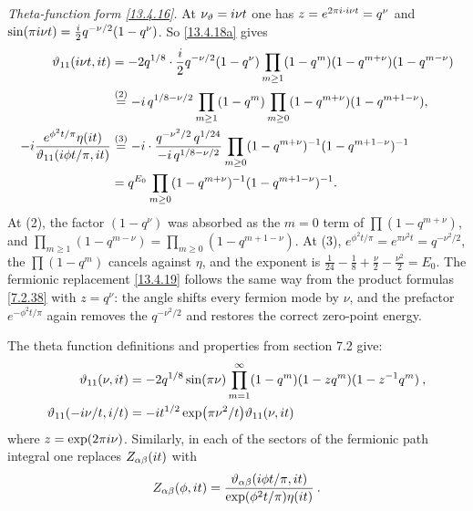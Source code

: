 \begin{tcolorbox}[breakable]
\begin{remark}
		\textit{Theta-function form \eqref{13.4.16}.} At $\nu_\vartheta=i\nu t$ one has $z=e^{2\pi i\cdot i\nu t}=q^{\nu}$ and $\sin(\pi i\nu t)=\frac{i}{2}q^{-\nu/2}(1-q^\nu)$. So \eqref{13.4.18a} gives
		\begin{align*}
			\vartheta_{11}(i\nu t,i t) &= -2q^{1/8}\cdot\frac{i}{2}q^{-\nu/2}(1-q^\nu)\prod_{m\ge1}(1-q^m)(1-q^{m+\nu})(1-q^{m-\nu})\\
			&\overset{(2)}{=} -i\,q^{1/8-\nu/2}\prod_{m\ge1}(1-q^m)\prod_{m\ge0}(1-q^{m+\nu})(1-q^{m+1-\nu}),\\
			-i\frac{e^{\phi^2t/\pi}\eta(i t)}{\vartheta_{11}(i\phi t/\pi,i t)} &\overset{(3)}{=} -i\cdot\frac{q^{-\nu^2/2}\,q^{1/24}}{-i\,q^{1/8-\nu/2}}\prod_{m\ge0}(1-q^{m+\nu})^{-1}(1-q^{m+1-\nu})^{-1}\\
			&= q^{E_0}\prod_{m\ge0}(1-q^{m+\nu})^{-1}(1-q^{m+1-\nu})^{-1}.
		\end{align*}
		At (2), the factor $(1-q^\nu)$ was absorbed as the $m=0$ term of $\prod(1-q^{m+\nu})$, and $\prod_{m\ge1}(1-q^{m-\nu})=\prod_{m\ge0}(1-q^{m+1-\nu})$. At (3), $e^{\phi^2t/\pi}=e^{\pi\nu^2t}=q^{-\nu^2/2}$, the $\prod(1-q^m)$ cancels against $\eta$, and the exponent is $\frac1{24}-\frac18+\frac\nu2-\frac{\nu^2}2=E_0$. The fermionic replacement \eqref{13.4.19} follows the same way from the product formulas \eqref{7.2.38} with $z=q^{\nu}$: the angle shifts every fermion mode by $\nu$, and the prefactor $e^{-\phi^2t/\pi}$ again removes the $q^{-\nu^2/2}$ and restores the correct zero-point energy.
	\end{remark}
\end{tcolorbox}
The theta function definitions and properties from section 7.2 give:
\begin{subequations} \label{13.4.18}
	\begin{align}
		\vartheta_{11}(\nu, i t) &= -2 q^{1/8}\sin(\pi\nu)\prod_{m=1}^\infty (1 - q^m)(1 - z q^m)(1 - z^{-1}q^m) \:, \label{13.4.18a} \\
		\vartheta_{11}(-i\nu/t, i/t) &= -i t^{1/2}\exp(\pi\nu^2/t)\vartheta_{11}(\nu, i t) \label{13.4.18b}
	\end{align}
\end{subequations}
where $z = \exp(2\pi i\nu)$. Similarly, in each of the sectors of the fermionic path integral one replaces $Z_{\alpha\beta}(i t)$ with
\begin{equation}
	Z_{\alpha\beta}(\phi, i t) = \frac{\vartheta_{\alpha\beta}(i\phi t/\pi, i t)}{\exp(\phi^2 t/\pi)\eta(i t)} \:. \label{13.4.19}
\end{equation}
